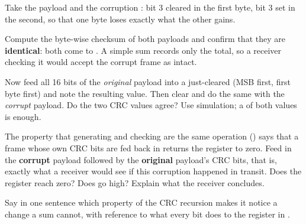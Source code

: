 Take the payload  and the corruption : bit 3 cleared in the first
byte, bit 3 set in the second, so that one byte loses exactly what the other gains.

 Compute the byte-wise checksum of both payloads and confirm that they are
\textbf{identical}: both come to . A simple sum records only the total, so a receiver
checking it would accept the corrupt frame as intact.

 Now feed all 16 bits of the \emph{original} payload into a just-cleared  (MSB
first, first byte first) and note the resulting  value. Then clear and do the same with the
\emph{corrupt} payload. Do the two CRC values agree? Use simulation; a  of both values
is enough.

 The property that generating and checking are the same operation
() says that a frame whose own CRC bits are fed back in returns the register
to zero. Feed in the \textbf{corrupt} payload followed by the \textbf{original} payload's CRC bits,
that is, exactly what a receiver would see if this corruption happened in transit. Does the register
reach zero? Does  go high? Explain what the receiver concludes.

 Say in one sentence which property of the CRC recursion makes it notice a change a sum
cannot, with reference to what every bit does to the register in .

